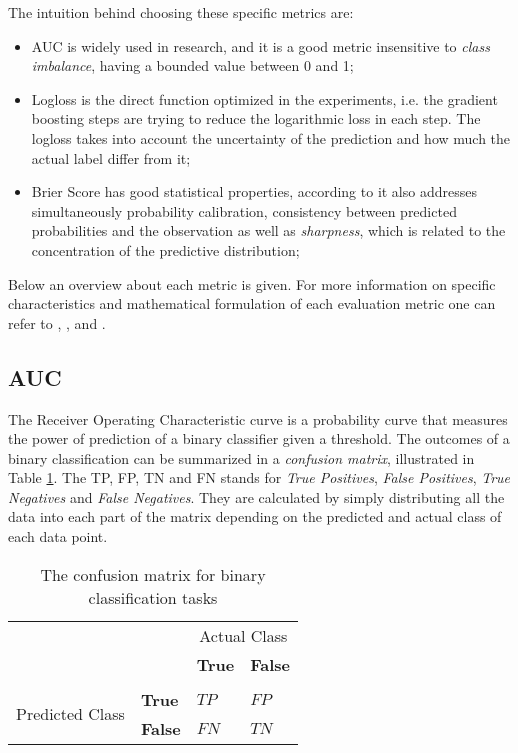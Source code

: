 The intuition behind choosing these specific metrics are:

\begin{itemize}
    \item AUC is widely used in research, and it is a good metric insensitive to \textit{class imbalance}, having a bounded value between 0 and 1;
    \item Logloss is the direct function optimized in the experiments, i.e. the gradient boosting steps are trying to reduce the logarithmic loss in each step. The logloss takes into account the uncertainty of the prediction and how much the actual label differ from it;
    \item Brier Score has good statistical properties, according to \cite{rufibach2010use} it also addresses simultaneously probability calibration, consistency between predicted probabilities and the observation as well as \textit{sharpness}, which is related to the concentration of the predictive distribution;
\end{itemize}

Below an overview about each metric is given. For more information on specific characteristics and mathematical formulation of each evaluation metric one can refer to \cite{BROWN200624}, \cite{rufibach2010use}, \cite{kuhn2013applied} and \cite{hastie2009elements}.

\subsection{AUC}

The Receiver Operating Characteristic curve is a probability curve that measures the power of prediction of a binary classifier given a threshold. The outcomes of a binary classification can be summarized in a \textit{confusion matrix}, illustrated in Table \ref{table:confusion-matrix}. The TP, FP, TN and FN stands for \textit{True Positives}, \textit{False Positives}, \textit{True Negatives} and \textit{False Negatives}. They are calculated by simply distributing all the data into each part of the matrix depending on the predicted and actual class of each data point.

\begin{table}[H]
    \centering
    \begin{tabular}{ll|ll}
                      &  & \multicolumn{2}{c}{Actual Class}                                 \\
                      &  & \multicolumn{1}{c}{\textbf{True}} & \multicolumn{1}{c}{\textbf{False}} \\
    \midrule \\
    \multirow{2}{*}{Predicted Class} & \textbf{True}  & $TP$ & $FP$\\
                                     & \textbf{False} & $FN$ & $TN$
    \end{tabular}
    \caption{The confusion matrix for binary classification tasks}
    \label{table:confusion-matrix}
\end{table}
    
